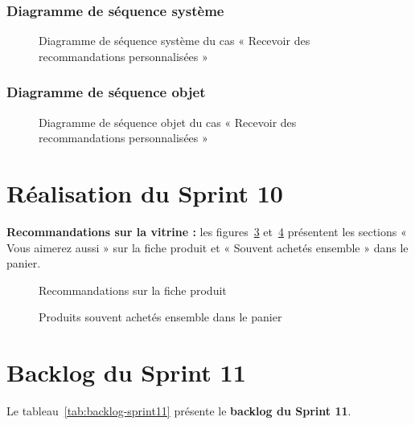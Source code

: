 \subsubsection{Diagramme de séquence système}
\begin{figure}[H]
    \centering
    \caption{Diagramme de séquence système du cas « Recevoir des recommandations personnalisées »}
    \label{fig:dss-reco}
\end{figure}

\subsubsection{Diagramme de séquence objet}
\begin{figure}[H]
    \centering
    \caption{Diagramme de séquence objet du cas « Recevoir des recommandations personnalisées »}
    \label{fig:dso-reco}
\end{figure}

\section{Réalisation du Sprint 10}
\textbf{Recommandations sur la vitrine :} les figures~\ref{fig:ui-reco-fiche} et~\ref{fig:ui-reco-panier} présentent les sections « Vous aimerez aussi » sur la fiche produit et « Souvent achetés ensemble » dans le panier.
\begin{figure}[H]
    \centering
    \caption{Recommandations sur la fiche produit}
    \label{fig:ui-reco-fiche}
\end{figure}
\begin{figure}[H]
    \centering
    \caption{Produits souvent achetés ensemble dans le panier}
    \label{fig:ui-reco-panier}
\end{figure}

\section{Backlog du Sprint 11}
Le tableau~\ref{tab:backlog-sprint11} présente le \textbf{backlog du Sprint 11}.


